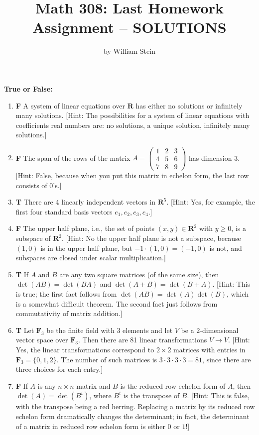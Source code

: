 \documentclass[10pt]{article}
\title{\color{blue}\bf Math 308: Last Homework Assignment -- SOLUTIONS}
\author{by William Stein}
\newcommand{\tf}[3]{\item {\bf {\color{blue}\hspace{1em}#1}}\hspace{1em} #2 [Hint: #3]}
\newcommand{\R}{\mathbf{R}}
\newcommand{\F}{\mathbf{F}}
\begin{document}
\maketitle

{\noindent\bf \color{red} True or False:}
\begin{enumerate}

\tf{F}{A system of linear equations over $\R$ has either no solutions or infinitely many solutions.}{The possibilities for a system
of linear equations with coefficients real numbers are: no solutions, a unique solution, infinitely many solutions.}

\tf{F}{The span of the rows of the matrix $A=\left(\begin{array}{rrr}
1 & 2 & 3 \\
4 & 5 & 6 \\
7 & 8 & 9
\end{array}\right)$ has dimension 3.}{False, because when you put this matrix in echelon form, the last row consists of 0's.}

\tf{T}{There are 4 linearly independent vectors in $\R^5$.}{Yes, for example, the first four standard basis vectors
$e_1, e_2, e_3, e_4$.}

\tf{F}{The upper half plane, i.e., the set of points $(x,y) \in \R^2$ with $y\geq 0$, is a subspace of $\R^2$.}{No the
upper half plane is not a subspace, because $(1,0)$ is in the upper half plane, but $-1 \cdot (1,0) = (-1,0)$ is not,
and subspaces are closed under scalar multiplication.}

\tf{T}{If $A$ and $B$ are any two square matrices (of the same size), then $\det(AB)=\det(BA)$ and $\det(A+B)=\det(B+A)$.}{This
is true; the first fact follows from $\det(AB)=\det(A)\det(B)$, which is a somewhat difficult theorem.  The second fact just
follows from commutativity of matrix addition.}

\tf{T}{Let $\F_3$ be the finite field with $3$ elements and let $V$ be a $2$-dimensional
    vector space over $\F_3$.  Then there are 81 linear transformations $V\to V$.}{Yes, the linear
    transformations correspond to $2\times 2$ matrices with entries in $\F_3=\{0,1,2\}$.  The
    number of such matrices is $3\cdot 3 \cdot 3 \cdot 3= 81$, since there are three choices
    for each entry.}

\tf{F}{If $A$ is any $n\times n$ matrix and $B$ is the reduced row echelon form of $A$, then $\det(A)=\det(B^t)$, where
$B^t$ is the transpose of $B$.}{This is false, with the transpose being a red herring.  Replacing a matrix by its reduced
row echelon form dramatically changes the determinant; in fact, the determinant of a matrix in reduced row echelon form
is either $0$ or $1$!}


\end{enumerate}
\end{document}
